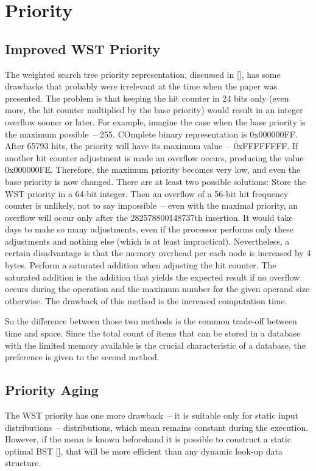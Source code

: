 \section{Priority}

\subsection{Improved WST Priority}
The weighted search tree priority representation, discussed in [], has some drawbacks that probably were irrelevant at the time when the paper was presented. The problem is that keeping the hit counter in 24 bits only (even more, the hit counter multiplied by the base priority) would result in an integer overflow sooner or later. For example, imagine the case when the base priority is the maximum possible~-- 255. COmplete binary representation is 0x000000FF. After 65793 hits, the priority will have its maximum value~-- 0xFFFFFFFF. If another hit counter adjustment is made an overflow occurs, producing the value 0x000000FE. Therefore, the maximum priority becomes very low, and even the base priority is now changed. There are at least two possible solutions:
Store the WST priority in a 64-bit integer. Then an overflow of a 56-bit hit frequency counter is unlikely, not to say impossible~-- even with the maximal priority, an overflow will occur only after the 282578800148737th insertion. It would take days to make so many adjustments, even if the processor performs only these adjustments and nothing else (which is at least impractical). Nevertheless, a certain disadvantage is that the memory overhead per each node is increased by 4 bytes.
Perform a saturated addition when adjusting the hit counter. The saturated addition is the addition that yields the expected result if no overflow occurs during the operation and the maximum number for the given operand size otherwise. The drawback of this method is the increased computation time.

So the difference between those two methods is the common trade-off between time and space. Since the total count of items that can be stored in a database with the limited memory available is the crucial characteristic of a database, the preference is given to the second method.


\subsection{Priority Aging}
The WST priority has one more drawback~-- it is suitable only for static input distributions~-- distributions, which mean remains constant during the execution. However, if the mean is known beforehand it is possible to construct a static optimal BST [], that will be more efficient than any dynamic look-up data structure.

